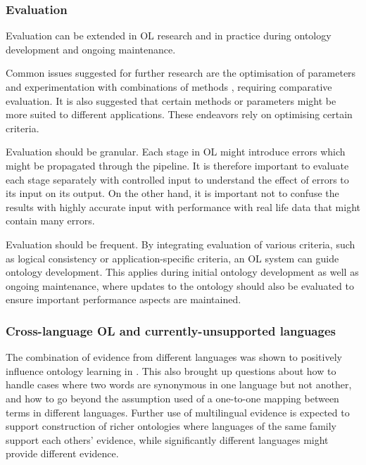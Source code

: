 \documentclass[a4paper]{report}
\begin{document}
\subsubsection{Evaluation}

Evaluation can be extended in OL research and in practice during ontology development and ongoing maintenance.

Common issues suggested for further research are the optimisation of parameters \cite{Hjelm09Thesis} and experimentation with combinations of methods \cite{Cimiano2005Text2Onto,Zouaq11OntoCmaps}, requiring comparative evaluation.
It is also suggested that certain methods or parameters might be more suited to different applications\cite{Gulla08LOUIE, Cimiano06}.
These endeavors rely on optimising certain criteria\cite{Cimiano2009OL}.

Evaluation should be granular.
Each stage in OL might introduce errors which might be propagated through the pipeline\cite{Zouaq11OntoCmaps, Hjelm09Thesis}.
It is therefore important to evaluate each stage separately with controlled input to understand  the effect of errors to its input on its output.
On the other hand, it is important not to confuse the results with highly accurate input with performance with real life data that might contain many errors.

Evaluation should be frequent.
By integrating evaluation of various criteria, such as logical consistency or application-specific criteria, an OL system can guide ontology development\cite{Cimiano2009OL}.
This applies during initial ontology development as well as ongoing maintenance, where updates to the ontology should also be evaluated to ensure important performance aspects are maintained\cite{HOO2009OntEngMeth}.

\subsubsection{Cross-language OL and currently-unsupported languages}

The combination of evidence from different languages was shown to positively influence ontology learning in \cite{Hjelm09Thesis}.
This also brought up questions about how to handle cases where two words are synonymous in one language but not another, and how to go beyond the assumption used of a one-to-one mapping between terms in different languages\cite{Hjelm09Thesis}.
Further use of multilingual evidence is expected to support construction of richer ontologies where languages of the same family support each others' evidence, while significantly different languages might provide different evidence\cite{Hjelm09Thesis}.
\end{document}
